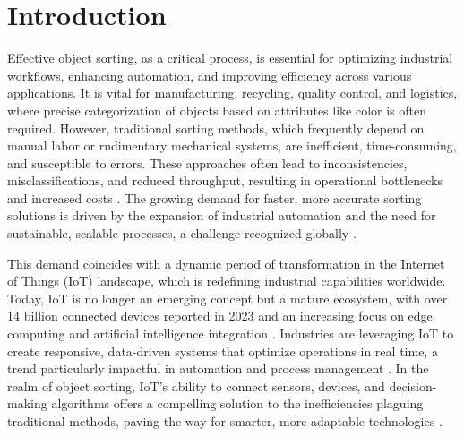 \documentclass[conference, onecolumn]{IEEEtran}
\begin{document}
\section{Introduction}

Effective object sorting, as a critical process, is essential for optimizing industrial workflows, enhancing automation, and improving efficiency across various applications. It is vital for manufacturing, recycling, quality control, and logistics, where precise categorization of objects based on attributes like color is often required. However, traditional sorting methods, which frequently depend on manual labor or rudimentary mechanical systems, are inefficient, time-consuming, and susceptible to errors. These approaches often lead to inconsistencies, misclassifications, and reduced throughput, resulting in operational bottlenecks and increased costs \cite{smith2019automation}. The growing demand for faster, more accurate sorting solutions is driven by the expansion of industrial automation and the need for sustainable, scalable processes, a challenge recognized globally \cite{patel2022iot, sharma2021automated}.

This demand coincides with a dynamic period of transformation in the Internet of Things (IoT) landscape, which is redefining industrial capabilities worldwide. Today, IoT is no longer an emerging concept but a mature ecosystem, with over 14 billion connected devices reported in 2023 and an increasing focus on edge computing and artificial intelligence integration \cite{iotanalytics2023}. Industries are leveraging IoT to create responsive, data-driven systems that optimize operations in real time, a trend particularly impactful in automation and process management \cite{gupta2020sorting}. In the realm of object sorting, IoT’s ability to connect sensors, devices, and decision-making algorithms offers a compelling solution to the inefficiencies plaguing traditional methods, paving the way for smarter, more adaptable technologies \cite{verma2023iot}.
\end{document}
